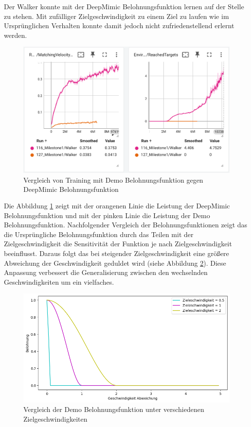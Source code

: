 Der Walker konnte mit der DeepMimic Belohnungsfunktion lernen auf der Stelle zu stehen. Mit zufälliger Zielgeschwindigkeit zu einem Ziel zu laufen wie im Ursprünglichen Verhalten konnte damit jedoch nicht zufriedenstellend erlernt werden.

\begin{figure}[H]
  \centering  
  \includegraphics[scale=0.5]{img/versuch4_training}
  \caption{Vergleich von Training mit Demo Belohnungsfunktion gegen DeepMimic Belohnungsfunktion}
  \label{fig:versuch4_training}
\end{figure}

Die Abbildung \ref{fig:versuch4_training} zeigt mit der orangenen Linie die Leistung der DeepMimic Belohnungsfunktion und mit der pinken Linie die Leistung der Demo Belohnungsfunktion. Nachfolgender Vergleich der Belohnungsfunktionen zeigt das die Ursprüngliche Belohnungsfunktion durch das Teilen mit der Zielgeschwindigkeit die Sensitivität der Funktion je nach Zielgeschwindigkeit beeinflusst. Daraus folgt das bei steigender Zielgeschwindigkeit eine größere Abweichung der Geschwindigkeit geduldet wird (siehe Abbildung \ref{fig:match_velocity_demo_vergleich}). Diese Anpassung verbessert die Generalisierung zwischen den wechselnden Geschwindigkeiten um ein vielfaches.

\begin{figure}[H]
  \centering  
  \includegraphics[scale=0.5]{img/match_velocity_demo_vergleich.png}
  \caption{Vergleich der Demo Belohnungsfunktion unter verschiedenen Zielgeschwindigkeiten}
  \label{fig:match_velocity_demo_vergleich}
\end{figure}

